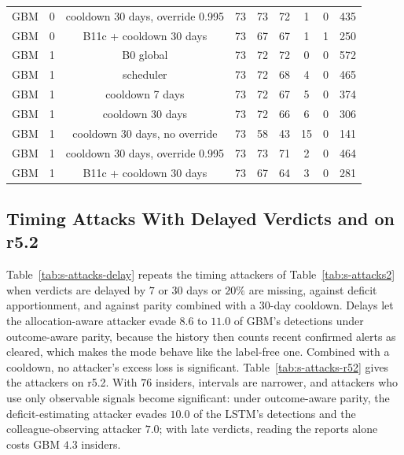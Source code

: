 \documentclass[10pt,onecolumn,letterpaper]{article}
\begin{document}
\begin{table}[!t]
{\begin{tabular}{lcccccccc}
GBM & 0 & cooldown 30 days, override 0.995 & 73 & 73 & 72 & 1 & 0 & 435 \\
GBM & 0 & B11c + cooldown 30 days & 73 & 67 & 67 & 1 & 1 & 250 \\
GBM & 1 & B0 global & 73 & 72 & 72 & 0 & 0 & 572 \\
GBM & 1 & scheduler & 73 & 72 & 68 & 4 & 0 & 465 \\
GBM & 1 & cooldown 7 days & 73 & 72 & 67 & 5 & 0 & 374 \\
GBM & 1 & cooldown 30 days & 73 & 72 & 66 & 6 & 0 & 306 \\
GBM & 1 & cooldown 30 days, no override & 73 & 58 & 43 & 15 & 0 & 141 \\
GBM & 1 & cooldown 30 days, override 0.995 & 73 & 73 & 71 & 2 & 0 & 464 \\
GBM & 1 & B11c + cooldown 30 days & 73 & 67 & 64 & 3 & 0 & 281 \\
\bottomrule
\end{tabular}}
\end{table}

\subsection{Timing Attacks With Delayed Verdicts and on r5.2}
Table~\ref{tab:s-attacks-delay} repeats the timing attackers of Table~\ref{tab:s-attacks2} when verdicts are delayed by $7$ or $30$ days or $20\%$ are missing, against deficit apportionment, and against parity combined with a 30-day cooldown. Delays let the allocation-aware attacker evade $8.6$ to $11.0$ of GBM's detections under outcome-aware parity, because the history then counts recent confirmed alerts as cleared, which makes the mode behave like the label-free one. Combined with a cooldown, no attacker's excess loss is significant. Table~\ref{tab:s-attacks-r52} gives the attackers on r5.2. With $76$ insiders, intervals are narrower, and attackers who use only observable signals become significant: under outcome-aware parity, the deficit-estimating attacker evades $10.0$ of the LSTM's detections and the colleague-observing attacker $7.0$; with late verdicts, reading the reports alone costs GBM $4.3$ insiders.
\end{document}
